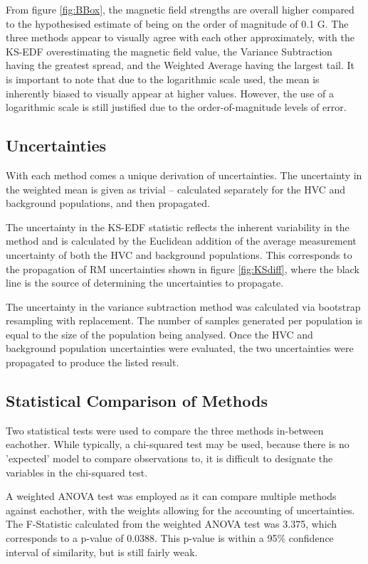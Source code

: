 From figure \ref{fig:BBox}, the magnetic field strengths are overall higher compared to the hypothesised estimate of being on the order of magnitude of 0.1 {\textmu}G. The three methods appear to visually agree with each other approximately, with the KS-EDF overestimating the magnetic field value, the Variance Subtraction having the greatest spread, and the Weighted Average having the largest tail. It is important to note that due to the logarithmic scale used, the mean is inherently biased to visually appear at higher values. However, the use of a logarithmic scale is still justified due to the order-of-magnitude levels of error.

\subsection{Uncertainties}
\label{ssec:results_uncertainties}

With each method comes a unique derivation of uncertainties. The uncertainty in the weighted mean is given as trivial – calculated separately for the HVC and background populations, and then propagated.


The uncertainty in the KS-EDF statistic reflects the inherent variability in the method and is calculated by the Euclidean addition of the average measurement uncertainty of both the HVC and background populations. This corresponds to the propagation of RM uncertainties shown in figure \ref{fig:KSdiff}, where the black line is the source of determining the uncertainties to propagate.


The uncertainty in the variance subtraction method was calculated via bootstrap resampling with replacement. The number of samples generated per population is equal to the size of the population being analysed. Once the HVC and background population uncertainties were evaluated, the two uncertainties were propagated to produce the listed result.

\subsection{Statistical Comparison of Methods}
\label{ssec:results_stats}

Two statistical tests were used to compare the three methods in-between eachother. While typically, a chi-squared test may be used, because there is no 'expected' model to compare observations to, it is difficult to designate the variables in the chi-squared test.

A weighted ANOVA test was employed as it can compare multiple methods against eachother, with the weights allowing for the accounting of uncertainties. The F-Statistic calculated from the weighted ANOVA test was 3.375, which corresponds to a p-value of 0.0388. This p-value is within a 95\% confidence interval of similarity, but is still fairly weak.

